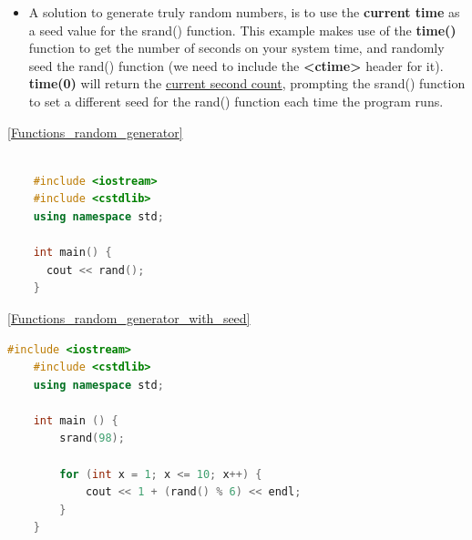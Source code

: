 \documentclass[12pt , a4paper]{article}
\newcommand{\hl}[1]{\colorbox{coolblack}{\color{cream}\textbf{#1}\color{black}}}
\begin{document}
\begin{itemize}
			\item A solution to generate truly random numbers, is to use the \textbf{current time} as a seed value for the srand() function. This example makes use of the \hl{time()} function to get the number of seconds on your system time, and randomly seed the rand() function (we need to include the \hl{<ctime>} header for it). \hl{time(0)} will return the \underline{current second count}, prompting the srand() function to set a different seed for the rand() function each time the program runs.\\
		\end{itemize}

	\ref{Functions_random_generator}
	\begin{lstlisting}[language=C++]

	#include <iostream>
	#include <cstdlib>
	using namespace std;
	
	int main() {
	  cout << rand();
	}

	\end{lstlisting}



	\ref{Functions_random_generator_with_seed}
	\begin{lstlisting}[language=C++]
	#include <iostream>
	#include <cstdlib>
	using namespace std;
	
	int main () {
	    srand(98);
	
	    for (int x = 1; x <= 10; x++) {
	        cout << 1 + (rand() % 6) << endl;
	    }
	}

	\end{lstlisting}
\end{document}
